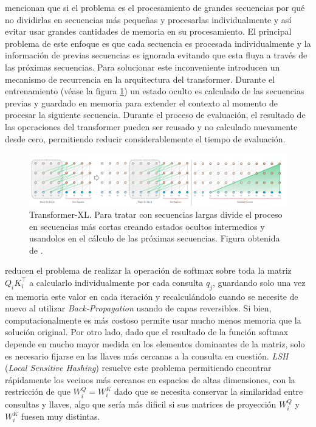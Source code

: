 \citeauthor*{DBLP:journals/corr/abs-1901-02860} mencionan que si el problema es el procesamiento de
grandes secuencias por qué no dividirlas en secuencias más pequeñas y procesarlas individualmente
y así evitar usar grandes cantidades de memoria en su procesamiento. El principal problema de este
enfoque es que cada secuencia es procesada individualmente y la información de previas secuencias es
ignorada evitando que esta fluya a través de las próximas secuencias. Para solucionar este
inconveniente introducen un mecanismo de recurrencia en la arquitectura del transformer. Durante el
entrenamiento (véase la figura \ref{fig:trans-xl}) un estado oculto es calculado de las secuencias previas y guardado
en memoria para extender el contexto al momento de procesar la siguiente secuencia. Durante el
proceso de evaluación, el resultado de las operaciones del transformer pueden ser reusado y no
calculado nuevamente desde cero, permitiendo reducir considerablemente el tiempo de evaluación.

\begin{figure}[ht!]
    \centering
    \includegraphics[width=0.8 \textwidth]{Chapters/1. Transformer/Figures/transformer/trans-XL.png}
    \caption{Transformer-XL. Para tratar con secuencias largas divide el proceso en secuencias más
             cortas creando estados ocultos intermedios y usandolos en el cálculo de las próximas
             secuencias. Figura obtenida de \cite{DBLP:journals/corr/abs-1901-02860}.}
    \label{fig:trans-xl}
\end{figure}

\citeauthor*{DBLP:journals/corr/abs-2001-04451} reducen el problema de realizar la operación de softmax
sobre toda la matriz $Q_i K_i^\top$ a calcularlo individualmente por cada consulta $q_j$, guardando
solo una vez en memoria este valor en cada iteración y recalculándolo cuando se necesite de nuevo
al utilizar \textit{Back-Propagation} usando de capas reversibles. Si bien, computacionalmente es
más costoso permite usar mucho
menos memoria que la solución original. Por otro lado, dado que el resultado de la función softmax
depende en mucho mayor medida en los elementos dominantes de la matriz, solo es necesario fijarse en
las llaves más cercanas a la consulta en cuestión. \textit{LSH} (\textit{Local Sensitive Hashing})
resuelve este problema permitiendo encontrar rápidamente los vecinos más cercanos en espacios de altas
dimensiones, con la  restricción de que $W_i^Q = W_i^K$ dado que se necesita conservar la
similaridad entre consultas y llaves, algo que sería más dificil si sus matrices de proyección
$W_i^Q$ y $W_i^K$ fuesen muy distintas.

